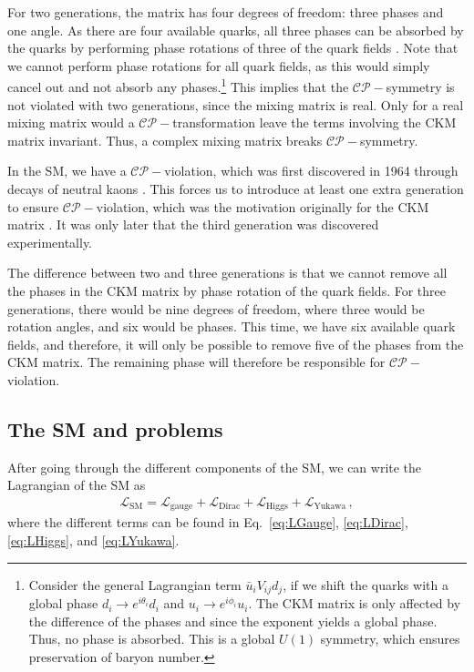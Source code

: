 For two generations, the matrix has four degrees of freedom: three phases and one angle. As there are four available quarks, all three phases can be absorbed by the quarks by performing phase rotations of three of the quark fields \cite{Peskin:1995ev}. Note that we cannot perform phase rotations for all quark fields, as this would simply cancel out and not absorb any phases.\footnote{Consider the general Lagrangian term $\bar{u}_i V_{ij} d_j$, if we shift the quarks with a global phase $d_i\to e^{i\theta_i}d_i$ and $u_i\to e^{i\phi_i}u_i$. The CKM matrix is only affected by the difference of the phases and since the exponent yields a global phase. Thus, no phase is absorbed. This is a global $U(1)$ symmetry, which ensures preservation of baryon number\cite{Pernow:2021fvb}. } This implies that the $\mathcal{CP}-$symmetry is not violated with two generations, since the mixing matrix is real. Only for a real mixing matrix would a $\mathcal{CP}-$transformation leave the terms involving the CKM matrix invariant. Thus, a complex mixing matrix breaks $\mathcal{CP}-$symmetry. 

In the SM, we have a $\mathcal{CP}-$violation, which was first discovered in 1964 through decays of neutral kaons \cite{Christenson:1964fg}. This forces us to introduce at least one extra generation to ensure $\mathcal{CP}-$violation, which was the motivation originally for the CKM matrix \cite{Cabibbo:1963yz,Kobayashi:1973fv}. It was only later that the third generation was discovered experimentally. 

The difference between two and three generations is that we cannot remove all the phases in the CKM matrix by phase rotation of the quark fields. For three generations, there would be nine degrees of freedom, where three would be rotation angles, and six would be phases. This time, we have six available quark fields, and therefore, it will only be possible to remove five of the phases from the CKM matrix. The remaining phase will therefore be responsible for $\mathcal{CP}-$violation.

\subsection{The SM and problems}
After going through the different components of the SM, we can write the Lagrangian of the SM as 
\begin{align}
    \mathcal{L}_{\mathrm{SM}} = \mathcal{L}_{\mathrm{gauge}} + \mathcal{L}_{\mathrm{Dirac}} + \mathcal{L}_{\mathrm{Higgs}} + \mathcal{L}_{\mathrm{Yukawa}}\,,
\end{align}
where the different terms can be found in Eq.~\eqref{eq:LGauge}, \eqref{eq:LDirac}, \eqref{eq:LHiggs}, and \eqref{eq:LYukawa}. 

